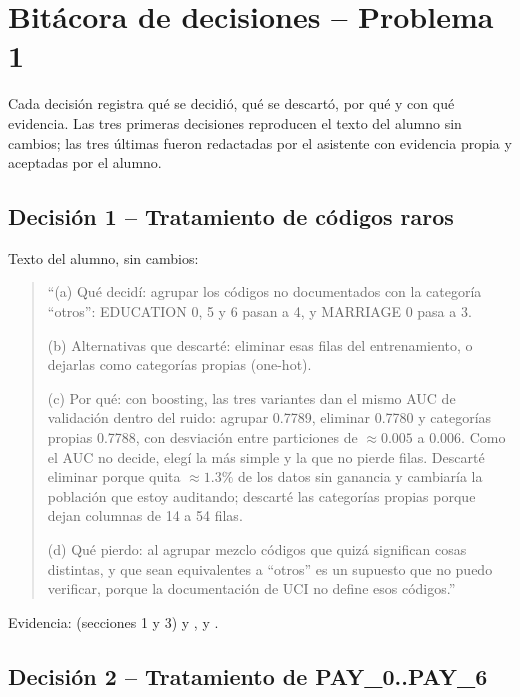 \section*{Bitácora de decisiones -- Problema 1}

Cada decisión registra qué se decidió, qué se descartó, por qué y con qué
evidencia. Las tres primeras decisiones reproducen el texto del alumno sin
cambios; las tres últimas fueron redactadas por el asistente con evidencia
propia y aceptadas por el alumno.

\subsection*{Decisión 1 -- Tratamiento de códigos raros}

Texto del alumno, sin cambios:
\begin{quote}
``(a) Qué decidí: agrupar los códigos no documentados con la categoría
``otros'': EDUCATION 0, 5 y 6 pasan a 4, y MARRIAGE 0 pasa a 3.

(b) Alternativas que descarté: eliminar esas filas del entrenamiento, o
dejarlas como categorías propias (one-hot).

(c) Por qué: con boosting, las tres variantes dan el mismo AUC de
validación dentro del ruido: agrupar 0.7789, eliminar 0.7780 y
categorías propias 0.7788, con desviación entre particiones de
$\approx 0.005$ a $0.006$. Como el AUC no decide, elegí la más simple y la que no
pierde filas. Descarté eliminar porque quita $\approx 1.3\%$ de los datos sin
ganancia y cambiaría la población que estoy auditando; descarté las
categorías propias porque dejan columnas de 14 a 54 filas.

(d) Qué pierdo: al agrupar mezclo códigos que quizá significan cosas
distintas, y que sean equivalentes a ``otros'' es un supuesto que no
puedo verificar, porque la documentación de UCI no define esos
códigos.''
\end{quote}
Evidencia:  (secciones 1 y 3) y
,
 y .

\subsection*{Decisión 2 -- Tratamiento de PAY\_0..PAY\_6}


